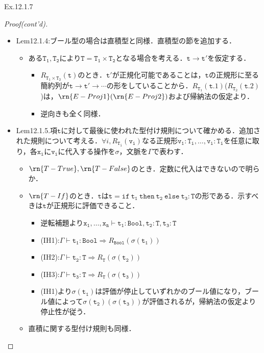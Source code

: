 \documentclass[9pt]{beamer}
\begin{document}
\begin{frame}{Ex.12.1.7}
\begin{proof}[Proof(cont'd)]
\begin{itemize}
\item Lem12.1.4:ブール型の場合は直積型と同様．直積型の節を追加する．\begin{itemize}
\item ある$\mathtt{T_{1},T_{2}}$により$\mathtt{T= T_{1}\times T_{2}}$となる場合を考える．$\mathtt{t\longrightarrow t'}$を仮定する．\begin{itemize}
\item $R_{\mathtt{T_{1}\times T_{2}}}(\mathtt{t})$のとき．$\mathtt{t'}$が正規化可能であることは，$\mathtt{t}$の正規形に至る簡約列が$\mathtt{t\longrightarrow t'\longrightarrow\cdots}$の形をしていることから．$R_{\mathtt{T_{1}}}(\mathtt{t.1})$($R_\mathtt{T_{2}}(\mathtt{t.2})$)は，$\rn{E-Proj1}(\rn{E-Proj2})$および帰納法の仮定より．
\item 逆向きも全く同様．
\end{itemize}
\end{itemize}
\item Lem12.1.5.項$\mathtt{t}$に対して最後に使われた型付け規則について確かめる．追加された規則について考える．$\forall i, R_{\mathtt{T_{i}}}(\mathtt{v_{i}})$なる正規形$\mathtt{v_{1}:T_{i},\ldots,v_{i}:T_{i}}$を任意に取り，各$\mathtt{x_{i}}$に$\mathtt{v_{i}}$に代入する操作を$\sigma$，文脈を$\Gamma$で表わす．
\begin{itemize}
\item $\rn{T-True},\rn{T-False}$のとき．定数に代入はできないので明らか．
\item $\rn{T-If}$のとき．$\mathtt{t}$は$\mathtt{t = if\ t_{1}\ then\ t_{2}\ else\ t_{3}:T}$の形である．示すべきは$\mathtt{t}$が正規形に評価できること．
\begin{itemize}
\item 逆転補題より$\mathtt{x_{1},\ldots, x_{n}\vdash t_{1}:Bool, t_{2}:T, t_{3}:T}$
\item (IH1):$\Gamma\vdash \mathtt{t_{1}:Bool}\Rightarrow R_{\mathtt{Bool}}(\sigma(\mathtt{t_{1}}))$
\item (IH2):$\Gamma\vdash\mathtt{t_{2}:T}\Rightarrow R_{\mathtt{T}}(\sigma(\mathtt{t_{2}}))$
\item (IH3):$\Gamma\vdash\mathtt{t_{3}:T}\Rightarrow R_{\mathtt{T}}(\sigma(\mathtt{t_{3}}))$
\item (IH1)より$\mathtt{\sigma(t_{1})}$は評価が停止していずれかのブール値になり，ブール値によって$\mathtt{\sigma(t_{2})}(\mathtt{\sigma(t_{3})})$が評価されるが，帰納法の仮定より停止性が従う．
\end{itemize}
\item 直積に関する型付け規則も同様．
\end{itemize}
\end{itemize}
\end{proof}
\end{frame}
\end{document}
